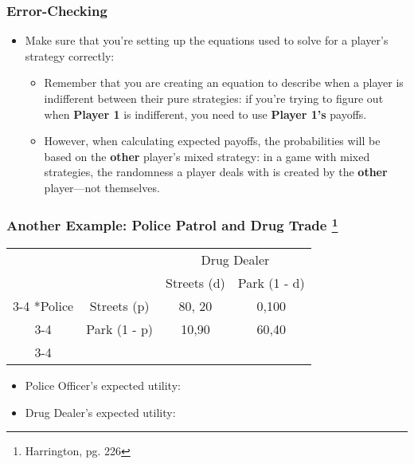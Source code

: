 
\begin{frame}
\frametitle{Error-Checking}
\begin{itemize}
	\item Make sure that you're setting up the equations used to solve for a player's strategy correctly:
	\begin{itemize}
		\item Remember that you are creating an equation to describe when a player is indifferent between their pure strategies: if you're trying to figure out when \textbf{Player 1} is indifferent, you need to use \textbf{Player 1's} payoffs.
		\item However, when calculating expected payoffs, the probabilities will be based on the \textbf{other} player's mixed strategy: in a game with mixed strategies, the randomness a player deals with is created by the \textbf{other} player---not themselves.
	\end{itemize}
\end{itemize}
\end{frame}


\begin{frame}
\frametitle{Another Example: Police Patrol and Drug Trade
  \footnote{Harrington, pg. 226}}
\begin{table}[h]
	\centering
	\begin{tabular}{cc|c|c|}
		& \multicolumn{1}{c}{} & \multicolumn{2}{c}{Drug Dealer}\\
		& \multicolumn{1}{c}{} & \multicolumn{1}{c}{Streets (d)}  & \multicolumn{1}{c}{Park (1 - d)} \\\cline{3-4}
		\multirow{2}*{Police}  & Streets (p) & 80, 20 & 0,100 \\\cline{3-4}
		& Park (1 - p) & 10,90 & 60,40 \\\cline{3-4}
	\end{tabular}
\end{table}
\begin{itemize}
	\item Police Officer's expected utility:
  \vspace{15mm}
	\item Drug Dealer's expected utility:
\end{itemize}
\end{frame}

